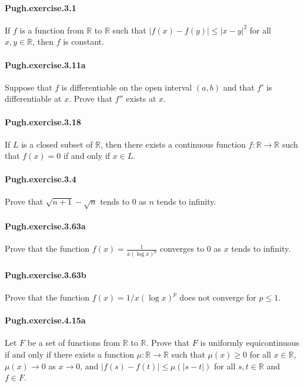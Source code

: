 \documentclass{article}
\begin{document}
\paragraph{Pugh.exercise.3.1} If $f$ is a function from $\mathbb{R}$ to $\mathbb{R}$ such that $|f(x)-f(y)|\leq |x-y|^2$ for all $x,y\in\mathbb{R}$, then $f$ is constant.

\paragraph{Pugh.exercise.3.11a} Suppose that $f$ is differentiable on the open interval $(a, b)$ and that $f'$ is differentiable at $x$. Prove that $f''$ exists at $x$.

\paragraph{Pugh.exercise.3.18} If $L$ is a closed subset of $\mathbb{R}$, then there exists a continuous function $f:\mathbb{R}\to\mathbb{R}$ such that $f(x)=0$ if and only if $x\in L$.

\paragraph{Pugh.exercise.3.4} Prove that $\sqrt{n+1}-\sqrt{n}$ tends to $0$ as $n$ tends to infinity.

\paragraph{Pugh.exercise.3.63a} Prove that the function $f(x)=\frac{1}{x(\log x)^p}$ converges to $0$ as $x$ tends to infinity.

\paragraph{Pugh.exercise.3.63b} Prove that the function $f(x)=1/x(\log x)^p$ does not converge for $p\leq 1$.

\paragraph{Pugh.exercise.4.15a} Let $F$ be a set of functions from $\mathbb{R}$ to $\mathbb{R}$. Prove that $F$ is uniformly equicontinuous if and only if there exists a function $\mu:\mathbb{R}\to\mathbb{R}$ such that $\mu(x)\geq 0$ for all $x\in\mathbb{R}$, $\mu(x)\to 0$ as $x\to 0$, and $|f(s)-f(t)|\leq \mu(|s-t|)$ for all $s,t\in\mathbb{R}$ and $f\in F$.
\end{document}
